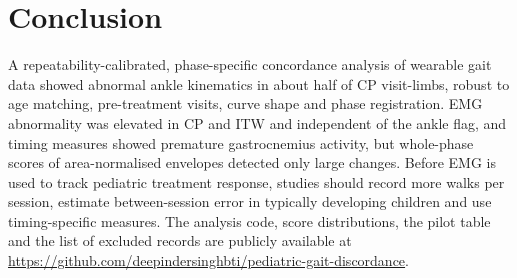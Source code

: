 \documentclass[conference]{IEEEtran}
\newcommand{\rtwo}[1]{{\color{rII}#1}}
\newcommand{\rthree}[1]{{\color{rIII}#1}}
\newcommand{\rtwo}[1]{#1}
\newcommand{\rthree}[1]{#1}
\begin{document}
\section{Conclusion}
A repeatability-calibrated, phase-specific concordance analysis of wearable gait data showed abnormal ankle kinematics in about half of CP visit-limbs, robust to age matching, pre-treatment visits, curve shape and phase registration. \rtwo{EMG abnormality was elevated in CP and ITW and independent of the ankle flag, and timing measures showed premature gastrocnemius activity, but whole-phase scores of area-normalised envelopes detected only large changes.} \rthree{Before EMG is used to track pediatric treatment response, studies should record more walks per session, estimate between-session error in typically developing children and use timing-specific measures.} \rtwo{The analysis code, score distributions, the pilot table and the list of excluded records} are publicly available at \url{https://github.com/deepindersinghbti/pediatric-gait-discordance}.
\end{document}
